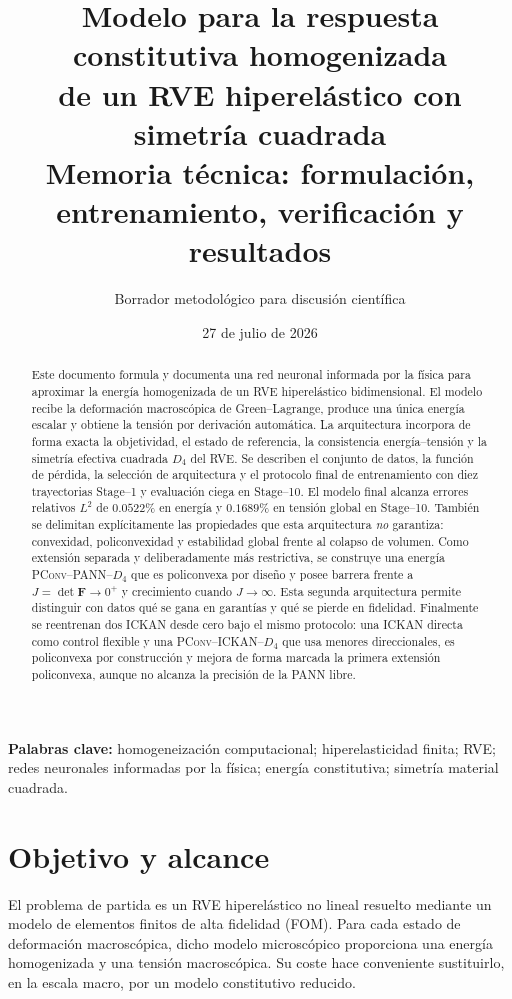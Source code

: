 \documentclass[11pt,a4paper]{article}
\title{Modelo \PANN{} para la respuesta constitutiva homogenizada\\
de un RVE hiperelástico con simetría cuadrada\\[3pt]
\large Memoria técnica: formulación, entrenamiento, verificación y resultados}
\author{Borrador metodológico para discusión científica}
\date{27 de julio de 2026}
\newcommand{\F}{\ensuremath{\bm F}}
\newcommand{\Dfour}{\ensuremath{D_4}}
\newcommand{\FOM}{\textsc{FOM}}
\newcommand{\PConvPANN}{\textsc{PConv--PANN--}\Dfour}
\newcommand{\PConvICKAN}{\textsc{PConv--ICKAN--}\Dfour}
\begin{document}
\maketitle

\begin{abstract}
Este documento formula y documenta una red neuronal informada por la física
para aproximar la energía homogenizada de un RVE hiperelástico bidimensional.
El modelo recibe la deformación macroscópica de Green--Lagrange, produce una
única energía escalar y obtiene la tensión por derivación automática. La
arquitectura incorpora de forma exacta la objetividad, el estado de referencia,
la consistencia energía--tensión y la simetría efectiva cuadrada \(\Dfour\) del
RVE. Se describen el conjunto de datos, la función de pérdida, la selección de
arquitectura y el protocolo final de entrenamiento con diez trayectorias
Stage--1 y evaluación ciega en Stage--10. El modelo final alcanza errores
relativos \(L^2\) de \(0.0522\%\) en energía y \(0.1689\%\) en tensión global
en Stage--10. También se delimitan explícitamente las propiedades que esta
arquitectura \emph{no} garantiza: convexidad, policonvexidad y estabilidad
global frente al colapso de volumen.
Como extensión separada y deliberadamente más restrictiva, se construye una
energía \PConvPANN{} que es policonvexa por diseño y posee barrera frente a
\(J=\det\F\to0^+\) y crecimiento cuando \(J\to\infty\). Esta segunda
arquitectura permite distinguir con datos qué se gana en garantías y qué se
pierde en fidelidad.
Finalmente se reentrenan dos ICKAN desde cero bajo el mismo protocolo: una
ICKAN directa como control flexible y una \PConvICKAN{} que usa menores
direccionales, es policonvexa por construcción y mejora de forma marcada la
primera extensión policonvexa, aunque no alcanza la precisión de la PANN
libre.
\end{abstract}

\textbf{Palabras clave:} homogeneización computacional; hiperelasticidad
finita; RVE; redes neuronales informadas por la física; energía constitutiva;
simetría material cuadrada.

\newpage

\section{Objetivo y alcance}

El problema de partida es un RVE hiperelástico no lineal resuelto mediante un
modelo de elementos finitos de alta fidelidad (\FOM). Para cada estado de
deformación macroscópica, dicho modelo microscópico proporciona una energía
homogenizada y una tensión macroscópica. Su coste hace conveniente sustituirlo,
en la escala macro, por un modelo constitutivo reducido.
\end{document}
